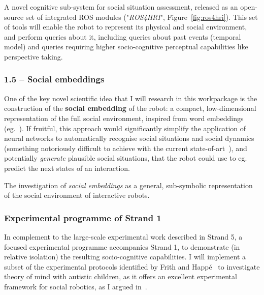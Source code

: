 \begin{outcome}{1.4}
A novel cognitive sub-system for social
    situation assessment, released as an open-source set of integrated ROS
    modules ("\emph{ROS4HRI}", Figure~\ref{fig:ros4hri}). This set of tools will enable the robot to
    represent its physical and social environment, and perform queries about it,
    including queries about past events (temporal model) and queries requiring
    higher socio-cognitive perceptual capabilities like perspective taking.
\end{outcome}


\subsubsection{1.5 -- Social embeddings}

One of the key novel scientific idea that I will research in this workpackage is
the construction of the \textbf{social embedding} of the robot:
a compact, low-dimensional representation of the full social environment,
inspired from word embeddings (eg.~\parencite{mikolov2013distributed}). If fruitful,
this approach would significantly simplify the application of neural networks to
automatically recognise social situations and social dynamics (something notoriously difficult
to achieve with the current state-of-art~\parencite{bartlett2019what}), and
potentially \emph{generate} plausible social situations, that the robot could
use to eg. predict the next states of an interaction.

\begin{outcome}{1.5}
The investigation of \emph{social
    embeddings} as a general, sub-symbolic representation of the social
    environment of interactive robots.
\end{outcome}

\subsubsection{Experimental programme of Strand 1}

In complement to the large-scale experimental work described in Strand 5, a focused experimental programme accompanies Strand 1, to demonstrate (in relative
isolation) the resulting socio-cognitive capabilities. I will implement a subset
of the experimental protocols identified by Frith and
Happé~\parencite{frith1994autism} to investigate theory of mind with autistic
children, as it offers an excellent experimental framework for social
robotics, as I argued in~\parencite{lemaignan2015mutual}.

